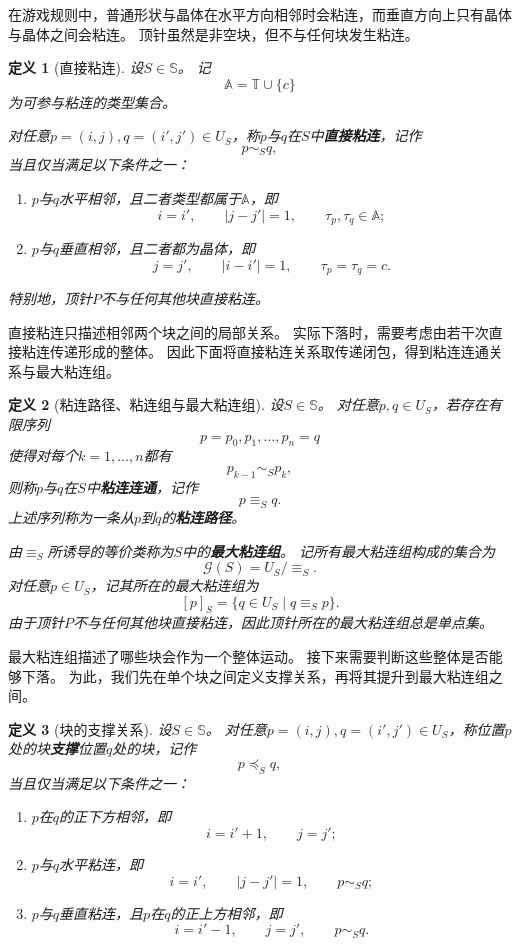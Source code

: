 \documentclass[UTF8,fontset=none]{ctexart}
\theoremstyle{cnthm}
\newtheorem{definition}{定义}[section]
\begin{document}
			在游戏规则中，普通形状与晶体在水平方向相邻时会粘连，而垂直方向上只有晶体与晶体之间会粘连。
			顶针虽然是非空块，但不与任何块发生粘连。
			
			\begin{definition}[直接粘连]
				设$S\in\mathbb{S}$。
				记
				$$
				\mathbb{A}=\mathbb{T}\cup\{c\}
				$$
				为可参与粘连的类型集合。
				
				对任意$p=(i,j),q=(i',j')\in U_S$，称$p$与$q$在$S$中\textbf{直接粘连}，记作
				$$
				p\sim_S q,
				$$
				当且仅当满足以下条件之一：
				\begin{enumerate}
					\item $p$与$q$水平相邻，且二者类型都属于$\mathbb{A}$，即
					$$
					i=i',\qquad |j-j'|=1,\qquad \tau_p,\tau_q\in \mathbb{A};
					$$
					\item $p$与$q$垂直相邻，且二者都为晶体，即
					$$
					j=j',\qquad |i-i'|=1,\qquad \tau_p=\tau_q=c.
					$$
				\end{enumerate}
				特别地，顶针$P$不与任何其他块直接粘连。
			\end{definition}
			
			直接粘连只描述相邻两个块之间的局部关系。
			实际下落时，需要考虑由若干次直接粘连传递形成的整体。
			因此下面将直接粘连关系取传递闭包，得到粘连连通关系与最大粘连组。
			
			\begin{definition}[粘连路径、粘连组与最大粘连组]
				设$S\in\mathbb{S}$。
				对任意$p,q\in U_S$，若存在有限序列
				$$
				p=p_0,p_1,\dots,p_n=q
				$$
				使得对每个$k=1,\dots,n$都有
				$$
				p_{k-1}\sim_S p_k,
				$$
				则称$p$与$q$在$S$中\textbf{粘连连通}，记作
				$$
				p\equiv_S q.
				$$
				上述序列称为一条从$p$到$q$的\textbf{粘连路径}。
				
				由$\equiv_S$所诱导的等价类称为$S$中的\textbf{最大粘连组}。
				记所有最大粘连组构成的集合为
				$$
				\mathcal{G}(S)=U_S/{\equiv_S}.
				$$
				对任意$p\in U_S$，记其所在的最大粘连组为
				$$
				[p]_S=\{q\in U_S\mid q\equiv_S p\}.
				$$
				由于顶针$P$不与任何其他块直接粘连，因此顶针所在的最大粘连组总是单点集。
			\end{definition}
			
			最大粘连组描述了哪些块会作为一个整体运动。
			接下来需要判断这些整体是否能够下落。
			为此，我们先在单个块之间定义支撑关系，再将其提升到最大粘连组之间。
			
			\begin{definition}[块的支撑关系]
				设$S\in\mathbb{S}$。
				对任意$p=(i,j),q=(i',j')\in U_S$，称位置$p$处的块\textbf{支撑}位置$q$处的块，记作
				$$
				p\preceq_S q,
				$$
				当且仅当满足以下条件之一：
				\begin{enumerate}
					\item $p$在$q$的正下方相邻，即
					$$
					i=i'+1,\qquad j=j';
					$$
					\item $p$与$q$水平粘连，即
					$$
					i=i',\qquad |j-j'|=1,\qquad p\sim_S q;
					$$
					\item $p$与$q$垂直粘连，且$p$在$q$的正上方相邻，即
					$$
					i=i'-1,\qquad j=j',\qquad p\sim_S q.
					$$
				\end{enumerate}
			\end{definition}
			
\end{document}
